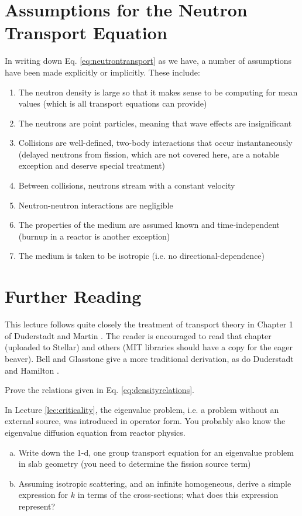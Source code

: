 \section*{Assumptions for the Neutron Transport Equation}
In writing down Eq. \ref{eq:neutrontransport} as we have, a number of assumptions have been made explicitly or implicitly.  These include:
\begin{enumerate}
   \item The neutron density is large so that it makes sense to be computing for mean values (which is all transport equations can provide)
   \item The neutrons are point particles, meaning that wave effects are insignificant
   \item Collisions are well-defined, two-body interactions that occur instantaneously (delayed neutrons from fission, which are not covered here, are a notable exception and deserve special treatment)
   \item Between collisions, neutrons stream with a constant velocity
   \item Neutron-neutron interactions are negligible
   \item The properties of the medium are assumed known and time-independent (burnup in a reactor is another exception)
   \item The medium is taken to be isotropic (i.e. no directional-dependence)
\end{enumerate}


\section*{Further Reading}
This lecture follows quite closely the treatment of transport theory in Chapter 1 of Duderstadt and Martin \cite{duderstadt1976tt}.  The reader is encouraged to read that chapter (uploaded to Stellar) and others (MIT libraries should have a copy for the eager beaver).  Bell and Glasstone \cite{bell1970nrt} give a more traditional derivation, as do Duderstadt and Hamilton \cite{duderstadt1976nra}.
 
\begin{exercises}
 
  \item Prove the relations given in Eq. \ref{eq:densityrelations}.

  \item In Lecture \ref{lec:criticality}, the eigenvalue problem, i.e. a problem without an external source, was introduced in operator form.  You probably also know the eigenvalue diffusion equation from reactor physics. 
  \begin{enumerate}[(a)]
   \item Write down the 1-d, one group transport equation for an eigenvalue problem in slab geometry (you need to determine the fission source term)
   \item Assuming isotropic scattering, and an infinite homogeneous, derive a simple expression for $k$ in terms of the cross-sections; what does this expression represent?
  \end{enumerate}


\end{exercises}
